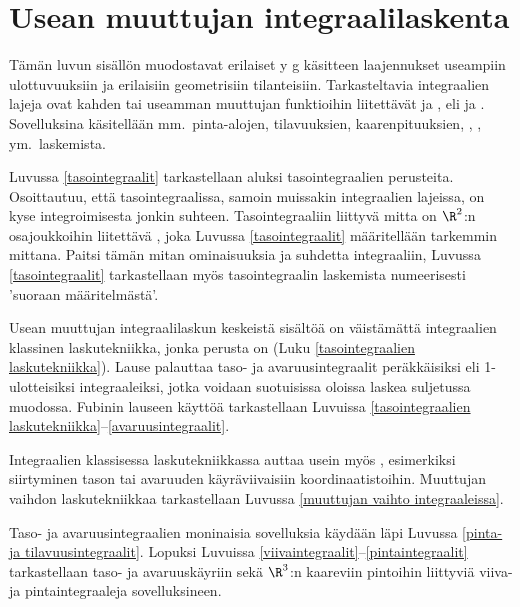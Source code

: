 \chapter{Usean muuttujan integraalilaskenta}

Tämän luvun sisällön muodostavat erilaiset y g
käsitteen laajennukset useampiin ulottuvuuksiin ja erilaisiin geometrisiin tilanteisiin.
Tarkasteltavia integraalien lajeja ovat kahden tai useamman muuttujan funktioihin 
liitettävät  ja ,  eli 
 ja . Sovelluksina käsitellään mm.\ pinta-alojen,
tilavuuksien, kaarenpituuksien, , , ym.\ laskemista.

Luvussa \ref{tasointegraalit} tarkastellaan aluksi tasointegraalien 
perusteita. Osoittautuu, että tasointegraalissa, samoin muissakin integraalien lajeissa, on
kyse integroimisesta jonkin  suhteen. Tasointegraaliin liittyvä mitta on $\R^2$:n
osajoukkoihin liitettävä , joka Luvussa \ref{tasointegraalit} määritellään
tarkemmin  mittana. Paitsi tämän mitan ominaisuuksia ja suhdetta integraaliin,
Luvussa \ref{tasointegraalit} tarkastellaan myös tasointegraalin laskemista numeerisesti 
'suoraan määritelmästä'.

Usean muuttujan integraalilaskun keskeistä sisältöä on väistämättä integraalien klassinen
laskutekniikka, jonka perusta on 
(Luku \ref{tasointegraalien laskutekniikka}). Lause palauttaa taso- ja avaruusintegraalit
peräkkäisiksi eli  1-ulotteisiksi integraaleiksi, jotka voidaan suotuisissa
oloissa laskea suljetussa muodossa. Fubinin lauseen käyttöä tarkastellaan Luvuissa
\ref{tasointegraalien laskutekniikka}--\ref{avaruusintegraalit}. 

Integraalien klassisessa laskutekniikkassa auttaa usein myös , esimerkiksi
siirtyminen tason tai avaruuden käyräviivaisiin koordinaatistoihin. Muuttujan vaihdon
laskutekniikkaa tarkastellaan Luvussa \ref{muuttujan vaihto integraaleissa}.

Taso- ja avaruusintegraalien moninaisia sovelluksia käydään läpi Luvussa
\ref{pinta- ja tilavuusintegraalit}. Lopuksi Luvuissa 
\ref{viivaintegraalit}--\ref{pintaintegraalit} tarkastellaan taso- ja avaruuskäyriin sekä
$\R^3$:n kaareviin pintoihin liittyviä viiva- ja pintaintegraaleja sovelluksineen. 

